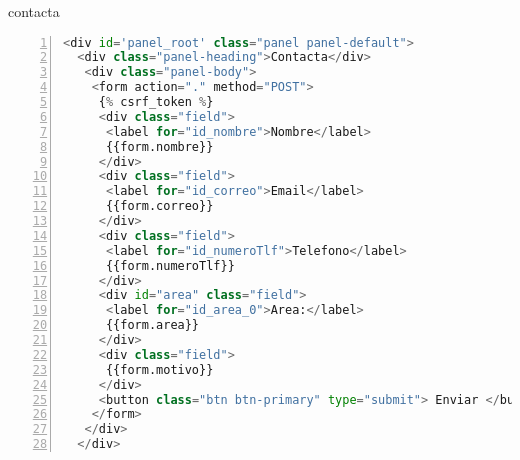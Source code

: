 contacta
\begin{lstlisting}[framerule=0pt,
aboveskip=0.5cm,
framextopmargin=3pt,
framexbottommargin=3pt,
framexleftmargin=0.4cm,
framesep=0pt,
rulesep=.4pt,
numbers=left,
numbersep=15pt,
numberstyle=\tiny,
numberfirstline = false,
breaklines=true,
frame=single,
stringstyle=\ttfamily,
showstringspaces = false,
basicstyle=\small\ttfamily,
keywordstyle=\bfseries,
rulesepcolor=\color{black},
captionpos=b,
language=Python,
caption=Contacta formato HTML.]
 <div id='panel_root' class="panel panel-default">
  <div class="panel-heading">Contacta</div>
   <div class="panel-body">		
    <form action="." method="POST">
     {% csrf_token %}
     <div class="field">
      <label for="id_nombre">Nombre</label>
      {{form.nombre}}
     </div>
     <div class="field">
      <label for="id_correo">Email</label>
      {{form.correo}}
     </div>
     <div class="field">
      <label for="id_numeroTlf">Telefono</label>
      {{form.numeroTlf}}
     </div>
	 <div id="area" class="field">
      <label for="id_area_0">Area:</label>
      {{form.area}}
     </div>
     <div class="field">
      {{form.motivo}}
     </div>
     <button class="btn btn-primary" type="submit"> Enviar </button>
    </form>
   </div>
  </div>
\end{lstlisting}

